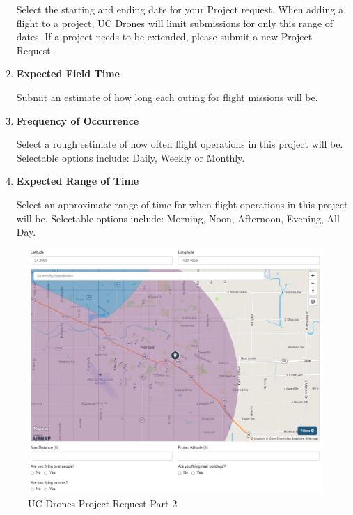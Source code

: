 \documentclass[
]{book}
\begin{document}
\begin{enumerate}
  Select the starting and ending date for your Project request. When adding a flight to a project, UC Drones will limit submissions for only this range of dates. If a project needs to be extended, please submit a new Project Request.
\item
  \textbf{Expected Field Time}

  Submit an estimate of how long each outing for flight missions will be.
\item
  \textbf{Frequency of Occurrence}

  Select a rough estimate of how often flight operations in this project will be. Selectable options include: Daily, Weekly or Monthly.
\item
  \textbf{Expected Range of Time}

  Select an approximate range of time for when flight operations in this project will be. Selectable options include: Morning, Noon, Afternoon, Evening, All Day.
\end{enumerate}

\begin{figure}

{\centering \includegraphics[width=0.95\linewidth]{images/UCDrones_project_2} 

}

\caption{UC Drones Project Request Part 2}\label{fig:UCDrones-project-p2}
\end{figure}
\end{document}
